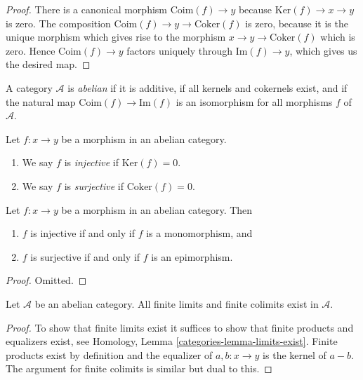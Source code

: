 \begin{proof}
There is a canonical morphism $\text{Coim}(f) \to y$
because $\text{Ker}(f) \to x \to y$ is zero.
The composition $\text{Coim}(f) \to y \to \text{Coker}(f)$
is zero, because it is the unique morphism which gives
rise to the morphism $x \to y \to \text{Coker}(f)$ which
is zero. Hence $\text{Coim}(f) \to y$ factors uniquely through
$\text{Im}(f) \to y$, which gives us the desired map.
\end{proof}

\begin{definition}
\label{definition-abelian-category}
A category $\mathcal{A}$ is {\it abelian} if
it is additive, if all kernels and cokernels exist,
and if the natural map $\text{Coim}(f) \to \text{Im}(f)$
is an isomorphism for all morphisms $f$ of
$\mathcal{A}$.
\end{definition}

\begin{definition}
\label{definition-injective-surjective}
Let $f : x \to y$ be a morphism in an abelian category.
\begin{enumerate}
\item We say $f$ is {\it injective} if $\text{Ker}(f) = 0$.
\item We say $f$ is {\it surjective} if $\text{Coker}(f) = 0$.
\end{enumerate}
\end{definition}

\begin{lemma}
\label{lemma-characterize-injective}
Let $f : x \to y$ be a morphism in an abelian category. Then
\begin{enumerate}
\item $f$ is injective if and only if $f$ is a monomorphism, and
\item $f$ is surjective if and only if $f$ is an epimorphism.
\end{enumerate}
\end{lemma}

\begin{proof}
Omitted.
\end{proof}

\begin{lemma}
\label{lemma-colimit-abelian-category}
Let $\mathcal{A}$ be an abelian category.
All finite limits and finite colimits exist in $\mathcal{A}$.
\end{lemma}

\begin{proof}
To show that finite limits exist it suffices to show
that finite products and equalizers exist, see
Homology, Lemma \ref{categories-lemma-limits-exist}.
Finite products exist
by definition and the equalizer of $a,b : x \to y$ is
the kernel of $a - b$. The argument for finite colimits
is similar but dual to this.
\end{proof}

